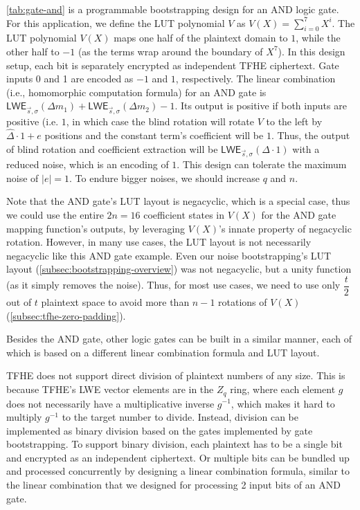 \autoref{tab:gate-and} is a programmable bootstrapping design for an AND logic gate. For this application, we define the LUT polynomial $V$ as $V(X) = \sum\limits_{i=0}^{7}X^i$. The LUT polynomial $V(X)$ maps one half of the plaintext domain to $1$, while the other half to $-1$ (as the terms wrap around the boundary of $X^7$). In this design setup, each bit is separately encrypted as independent TFHE ciphertext. Gate inputs 0 and 1 are encoded as $-1$ and $1$, respectively. The linear combination (i.e., homomorphic computation formula) for an AND gate is $\textsf{LWE}_{\vec{s}, \sigma}(\Delta m_1) + \textsf{LWE}_{\vec{s}, \sigma}(\Delta m_2) - 1$. Its output is positive if both inputs are positive (i.e. $1$, in which case the blind rotation will rotate $V$ to the left by $\hat\Delta\cdot 1 + e$ positions and the constant term's coefficient will be $1$. Thus, the output of blind rotation and coefficient extraction will be $\textsf{LWE}_{\vec{s}, \sigma}(\Delta \cdot 1)$ with a reduced noise, which is an encoding of $1$. This design can tolerate the maximum noise of $|e| = 1$. To endure bigger noises, we should increase $q$ and $n$. 

Note that the AND gate's LUT layout is negacyclic, which is a special case, thus we could use the entire $2n=16$ coefficient states in $V(X)$ for the AND gate mapping function's outputs, by leveraging $V(X)$'s innate property of negacyclic rotation. However, in many use cases, the LUT layout is not necessarily negacyclic like this AND gate example. Even our noise bootstrapping's LUT layout (\autoref{subsec:bootstrapping-overview}) was not negacyclic, but a unity function (as it simply removes the noise). Thus, for most use cases, we need to use only $\dfrac{t}{2}$ out of $t$ plaintext space to avoid more than $n-1$ rotations of $V(X)$ (\autoref{subsec:tfhe-zero-padding}). 

Besides the AND gate, other logic gates can be built in a similar manner, each of which is based on a different linear combination formula and LUT layout. 

 TFHE does not support direct division of plaintext numbers of any size. This is because TFHE's LWE vector elements are in the $Z_q$ ring, where each element $g$ does not necessarily have a multiplicative inverse $g^{-1}$, which makes it hard to multiply $g^{-1}$ to the target number to divide. Instead, division can be implemented as binary division based on the gates implemented by gate bootstrapping. To support binary division, each plaintext has to be a single bit and encrypted as an independent ciphertext. Or multiple bits can be bundled up and processed concurrently by designing a linear combination formula, similar to the linear combination that we designed for processing 2 input bits of an AND gate.


